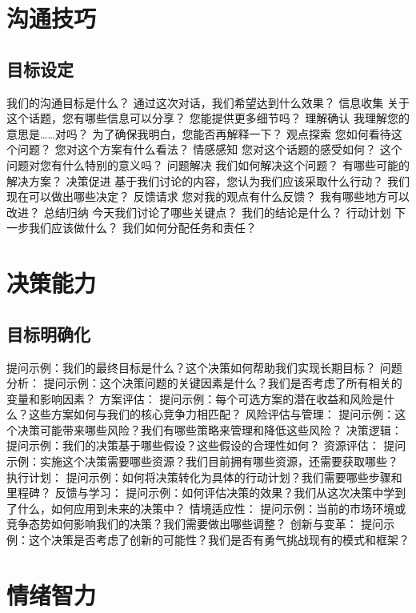 \documentclass[12pt]{book}
\begin{document}
\section{沟通技巧}
\subsection{目标设定}
我们的沟通目标是什么？
通过这次对话，我们希望达到什么效果？
信息收集
关于这个话题，您有哪些信息可以分享？
您能提供更多细节吗？
理解确认
我理解您的意思是……对吗？
为了确保我明白，您能否再解释一下？
观点探索
您如何看待这个问题？
您对这个方案有什么看法？
情感感知
您对这个话题的感受如何？
这个问题对您有什么特别的意义吗？
问题解决
我们如何解决这个问题？
有哪些可能的解决方案？
决策促进
基于我们讨论的内容，您认为我们应该采取什么行动？
我们现在可以做出哪些决定？
反馈请求
您对我的观点有什么反馈？
我有哪些地方可以改进？
总结归纳
今天我们讨论了哪些关键点？
我们的结论是什么？
行动计划
下一步我们应该做什么？
我们如何分配任务和责任？


\section{决策能力}
\subsection{目标明确化}
提问示例：我们的最终目标是什么？这个决策如何帮助我们实现长期目标？
问题分析：
提问示例：这个决策问题的关键因素是什么？我们是否考虑了所有相关的变量和影响因素？
方案评估：
提问示例：每个可选方案的潜在收益和风险是什么？这些方案如何与我们的核心竞争力相匹配？
风险评估与管理：
提问示例：这个决策可能带来哪些风险？我们有哪些策略来管理和降低这些风险？
决策逻辑：
提问示例：我们的决策基于哪些假设？这些假设的合理性如何？
资源评估：
提问示例：实施这个决策需要哪些资源？我们目前拥有哪些资源，还需要获取哪些？
执行计划：
提问示例：如何将决策转化为具体的行动计划？我们需要哪些步骤和里程碑？
反馈与学习：
提问示例：如何评估决策的效果？我们从这次决策中学到了什么，如何应用到未来的决策中？
情境适应性：
提问示例：当前的市场环境或竞争态势如何影响我们的决策？我们需要做出哪些调整？
创新与变革：
提问示例：这个决策是否考虑了创新的可能性？我们是否有勇气挑战现有的模式和框架？


\section{情绪智力}
\end{document}
